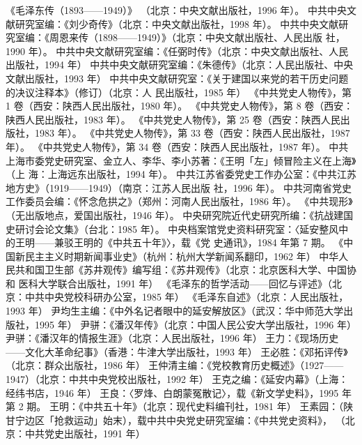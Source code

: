 \begin{thebibliography}{999}
\bibitem{} 《毛泽东传（1893——1949）》
（北京：中央文献出版社，1996 年）。
\bibitem{} 中共中央文献研究室编：《刘少奇传》（北京：中央文献出版社，1998 年）。
\bibitem{} 中共中央文献研究室编：《周恩来传（1898——1949）》（北京：中央文献出版社、人民出版
社，1990 年）。
\bibitem{} 中共中央文献研究室编：《任弼时传》（北京：中央文献出版社、人民出版社，1994 年）
\bibitem{} 中共中央文献研究室编：《朱德传》（北京：人民出版社、中央文献出版社，1993 年）
\bibitem{} 中共中央文献研究室：《关于建国以来党的若干历史问题的决议注释本》（修订）（北京：人
民出版社，1985 年）
\bibitem{} 《中共党史人物传》，第 1 卷（西安：陕西人民出版社，1980 年）。
\bibitem{} 《中共党史人物传》，第 8 卷（西安：陕西人民出版社，1983 年）。
\bibitem{} 《中共党史人物传》，第 25 卷（西安：陕西人民出版社，1983 年）。
\bibitem{} 《中共党史人物传》，第 33 卷（西安：陕西人民出版社，1987 年）。
\bibitem{} 《中共党史人物传》，第 34 卷（西安：陕西人民出版社，1987 年）。
\bibitem{} 中共上海市委党史研究室、金立人、李华、李小苏著：《王明「左」倾冒险主义在上海》（上 海：上海远东出版社，1994 年）。
\bibitem{} 中共江苏省委党史工作办公室：《中共江苏地方史》（1919——1949）（南京：江苏人民出版 社，1996 年）。
\bibitem{} 中共河南省党史工作委员会编：《怀念危拱之》（郑州：河南人民出版社，1986 年）。
\bibitem{} 《中共现形》（无出版地点，爱国出版社，1946 年）。
\bibitem{} 中央研究院近代史研究所编：《抗战建国史研讨会论文集》（台北：1985 年）。
\bibitem{} 中央档案馆党史资料研究室：〈延安整风中的王明——兼驳王明的《中共五十年》〉，载《党 史通讯》，1984 年第 7 期。
\bibitem{} 《中国新民主主义时期新闻事业史》（杭州：杭州大学新闻系翻印，1962 年）
\bibitem{} 中华人民共和国卫生部《苏井观传》编写组：《苏井观传》（北京：北京医科大学、中国协和 医科大学联合出版社，1991 年）
\bibitem{} 《毛泽东的哲学活动——回忆与评述》（北京：中共中央党校科研办公室，1985 年）
\bibitem{} 《毛泽东自述》（北京：人民出版社，1993 年）
\bibitem{} 尹均生主编：《中外名记者眼中的延安解放区》（武汉：华中师范大学出版社，1995 年）
\bibitem{} 尹骈：《潘汉年传》（北京：中国人民公安大学出版社，1996 年）
\bibitem{} 尹骈：《潘汉年的情报生涯》（北京：人民出版社，1996 年）
\bibitem{} 王力：《现场历史——文化大革命纪事》（香港：牛津大学出版社，1993 年）
\bibitem{} 王必胜：《邓拓评传》（北京：群众出版社，1986 年）
\bibitem{} 王仲清主编：《党校教育历史概述》（1927——1947）（北京：中共中央党校出版社，1992 年）
\bibitem{} 王克之编：《延安内幕》（上海：经纬书店，1946 年）
\bibitem{} 王良：〈罗烽、白朗蒙冤散记〉，载《新文学史料》，1995 年第 2 期。
\bibitem{} 王明：《中共五十年》（北京：现代史料编刊社，1981 年）
\bibitem{} 王素园：（陕甘宁边区「抢救运动」始末），载中共中央党史研究室编：《中共党史资料》， （北京：中共党史出版社，1991 年）

\end{thebibliography}

